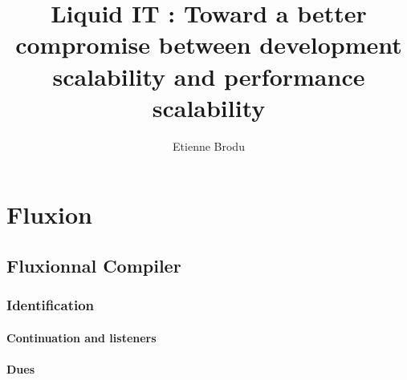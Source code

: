 \documentclass[12pt]{report}
\begin{document}
\title{Liquid IT : Toward a better compromise between development scalability and performance scalability }
\author{Etienne Brodu}

\maketitle



\tableofcontents




% 


\chapter{Fluxion}

  \section{Fluxionnal Compiler}
    \subsection{Identification}
      \subsubsection{Continuation and listeners}
      \subsubsection{Dues}
\end{document}
